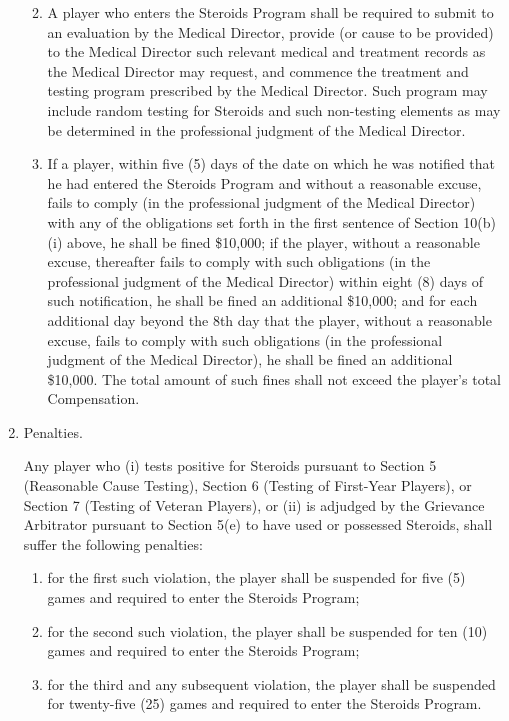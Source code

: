 \documentclass[
]{book}
\providecommand{\tightlist}{%
  \setlength{\itemsep}{0pt}\setlength{\parskip}{0pt}}
\begin{document}
\begin{enumerate}
  \begin{enumerate}
  \def\labelenumii{(\roman{enumii})}
  \tightlist
  \item
    A player who enters the Steroids Program shall be required to submit to an evaluation by the Medical Director, provide (or cause to be provided) to the Medical Director such relevant medical and treatment records as the Medical Director may request, and commence the treatment and testing program prescribed by the Medical Director. Such program may include random testing for Steroids and such non-testing elements as may be determined in the professional judgment of the Medical Director.
  \item
    If a player, within five (5) days of the date on which he was notified that he had entered the Steroids Program and without a reasonable excuse, fails to comply (in the professional judgment of the Medical Director) with any of the obligations set forth in the first sentence of Section 10(b)(i) above, he shall be fined \$10,000; if the player, without a reasonable excuse, thereafter fails to comply with such obligations (in the professional judgment of the Medical Director) within eight (8) days of such notification, he shall be fined an additional \$10,000; and for each additional day beyond the 8th day that the player, without a reasonable excuse, fails to comply with such obligations (in the professional judgment of the Medical Director), he shall be fined an additional \$10,000. The total amount of such fines shall not exceed the player's total Compensation.
  \end{enumerate}
\item
  Penalties.

  Any player who (i) tests positive for Steroids pursuant to Section 5 (Reasonable Cause Testing), Section 6 (Testing of First-Year Players), or Section 7 (Testing of Veteran Players), or (ii) is adjudged by the Grievance Arbitrator pursuant to Section 5(e) to have used or possessed Steroids, shall suffer the following penalties:

  \begin{enumerate}
  \def\labelenumii{(\Alph{enumii})}
  \tightlist
  \item
    for the first such violation, the player shall be suspended for five (5) games and required to enter the Steroids Program;
  \item
    for the second such violation, the player shall be suspended for ten (10) games and required to enter the Steroids Program;
  \item
    for the third and any subsequent violation, the player shall be suspended for twenty-five (25) games and required to enter the Steroids Program.
  \end{enumerate}
\end{enumerate}
\end{document}
